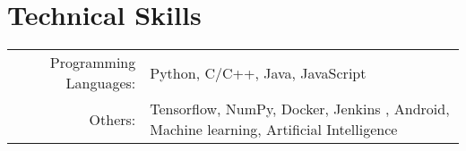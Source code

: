 \section{Technical Skills}
\renewcommand{\arraystretch}{1}%
\begin{tabular}{rl}

Programming Languages: &  Python, C/C++, Java, JavaScript\\
Others: & Tensorflow, NumPy, Docker, Jenkins , Android, Machine learning, Artificial Intelligence \\
\end{tabular}
\vspace{5pt}
